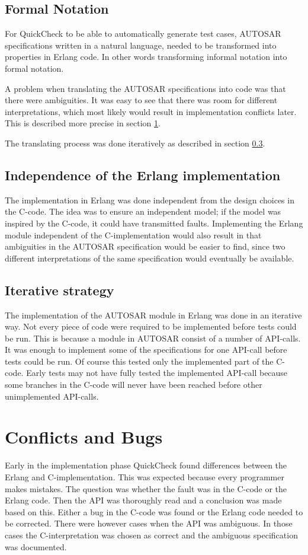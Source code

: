 \subsection{Formal Notation}
For QuickCheck to be able to automatically generate test cases,
AUTOSAR specifications written in a natural language, needed to be
transformed into properties in Erlang code. In other words
transforming informal notation into formal notation.

A problem when translating the AUTOSAR specifications into code was
that there were ambiguities. It was easy to see that there was room
for different interpretations, which most likely would result in
implementation conflicts later. This is described more precise in section
\ref{SUBSEC:CONFLICTS}.

The translating process was done iteratively as described in section
\ref{SEC:ITERATIVE}.

\subsection{Independence of the Erlang implementation}
The implementation in Erlang was done independent from the design
choices in the C-code. The idea was to ensure an independent model; if
the model was inspired by the C-code, it could have transmitted
faults. Implementing the Erlang module independent of the
C-implementation would also result in that ambiguities in the
AUTOSAR specification would be easier to find, since two
different interpretations of the same specification would eventually be
available.

\subsection{Iterative strategy}
\label{SEC:ITERATIVE}
The implementation of the AUTOSAR module in Erlang was done in an
iterative way. Not every piece of code were required to be implemented
before tests could be run. This is because a module in AUTOSAR consist
of a number of API-calls. It was enough to implement some of the
specifications for one API-call before tests could be run. Of course
this tested only the implemented part of the C-code. Early tests may
not have fully tested the implemented API-call because some branches
in the C-code will never have been reached before other unimplemented
API-calls.

\section{Conflicts and Bugs}
\label{SUBSEC:CONFLICTS}
Early in the implementation phase QuickCheck found differences between
the Erlang and C-implementation. This was expected because every
programmer makes mistakes.  The question was whether the fault was in
the C-code or the Erlang code. Then the API was thoroughly read and a
conclusion was made based on this. Either a bug in the C-code was
found or the Erlang code needed to be corrected. There were however
cases when the API was ambiguous. In those cases the C-interpretation
was chosen as correct and the ambiguous specification was documented.

